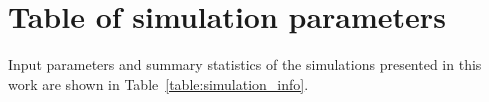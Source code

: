 \documentclass[twocolumn]{aastex631}
\newcommand{\mP}{\ensuremath{\mathcal{P}}}
\newcommand{\mR}{\ensuremath{\mathcal{R}}}
\newcommand{\mS}{\ensuremath{\mathcal{S}}}
\newcommand{\angles}[1]{\langle #1 \rangle}
\begin{document}
\section{Table of simulation parameters}
\label{app:simulation_table}
Input parameters and summary statistics of the simulations presented in this work are shown in Table~\ref{table:simulation_info}.

\end{document}
